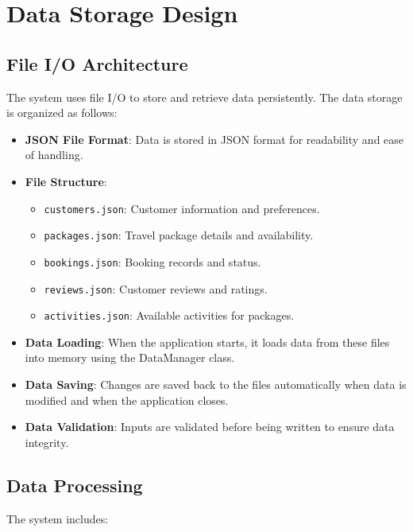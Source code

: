 \documentclass[12pt]{article}
\begin{document}
\section{Data Storage Design}

\subsection{File I/O Architecture}
The system uses file I/O to store and retrieve data persistently. The data storage is organized as follows:

\begin{itemize}
    \item \textbf{JSON File Format}: Data is stored in JSON format for readability and ease of handling.
    
    \item \textbf{File Structure}:
    \begin{itemize}
        \item \texttt{customers.json}: Customer information and preferences.
        \item \texttt{packages.json}: Travel package details and availability.
        \item \texttt{bookings.json}: Booking records and status.
        \item \texttt{reviews.json}: Customer reviews and ratings.
        \item \texttt{activities.json}: Available activities for packages.
    \end{itemize}
    
    \item \textbf{Data Loading}: When the application starts, it loads data from these files into memory using the DataManager class.
    
    \item \textbf{Data Saving}: Changes are saved back to the files automatically when data is modified and when the application closes.
    
    \item \textbf{Data Validation}: Inputs are validated before being written to ensure data integrity.
\end{itemize}

\subsection{Data Processing}
The system includes:
\end{document}
